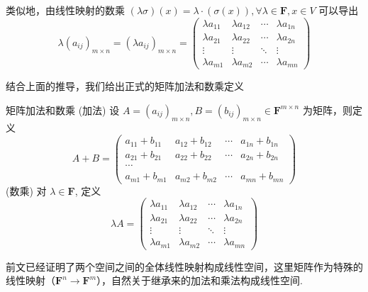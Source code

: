 类似地，由线性映射的数乘 $(\lambda \sigma)(x) = \lambda\cdot(\sigma(x)), \forall \lambda\in\mathbf{F}, x\in V$ 可以导出
\[
    \lambda (a_{ij})_{m\times n} = (\lambda a_{ij})_{m\times n} = \begin{pmatrix}
        \lambda a_{11} & \lambda a_{12} & \cdots & \lambda a_{1n} \\
        \lambda a_{21} & \lambda a_{22} & \cdots & \lambda a_{2n} \\
        \vdots & \vdots & \ddots & \vdots \\
        \lambda a_{m1} & \lambda a_{m2} & \cdots & \lambda a_{mn}
    \end{pmatrix}
\]

结合上面的推导，我们给出正式的矩阵加法和数乘定义
\begin{definition}{矩阵加法和数乘}{}
    (加法) 设 $A = (a_{ij})_{m\times n}, B = (b_{ij})_{m\times n} \in \mathbf{F}^{m\times n}$ 为矩阵，则定义
    \[
        A + B = \begin{pmatrix}
            a_{11} + b_{11} & a_{12} + b_{12} & \cdots & a_{1n} + b_{1n} \\
            a_{21} + b_{21} & a_{22} + b_{22} & \cdots & a_{2n} + b_{2n} \\
            \cdots\\
            a_{m1} + b_{m1} & a_{m2} + b_{m2} & \cdots & a_{mn} + b_{mn}
        \end{pmatrix}
    \]
    (数乘) 对 $\lambda\in\mathbf{F}$, 定义
    \[
        \lambda A = \begin{pmatrix}
            \lambda a_{11} & \lambda a_{12} & \cdots & \lambda a_{1n} \\
            \lambda a_{21} & \lambda a_{22} & \cdots & \lambda a_{2n} \\
            \vdots & \vdots & \ddots & \vdots \\
            \lambda a_{m1} & \lambda a_{m2} & \cdots & \lambda a_{mn}
        \end{pmatrix}
    \]
\end{definition}

前文已经证明了两个空间之间的全体线性映射构成线性空间，这里矩阵作为特殊的线性映射（$\mathbf{F}^n\to\mathbf{F}^m$），自然关于继承来的加法和乘法构成线性空间.


